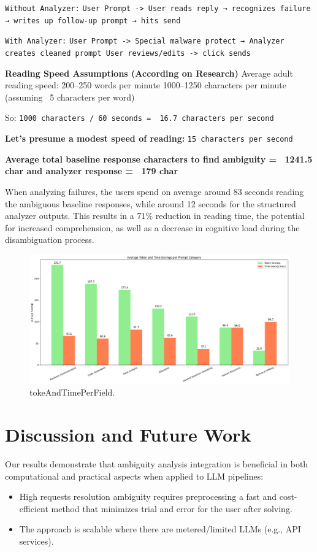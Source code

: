 \documentclass[conference]{IEEEtran}
\begin{document}
\texttt{Without Analyzer:}
\texttt{User Prompt -> User reads reply → recognizes failure → writes up follow-up prompt → hits send}

\texttt{With Analyzer:}
\texttt{User Prompt -> Special malware protect → Analyzer creates cleaned prompt User reviews/edits -> click sends}

\textbf{Reading Speed Assumptions (According on Research)}
Average adult reading speed:
200–250 words per minute
1000–1250 characters per minute (assuming ~5 characters per word)

So:
\texttt{1000 characters / 60 seconds = ~16.7 characters per second}

\textbf{Let's presume a modest speed of reading:}
\texttt{15 characters per second}

\textbf{Average total baseline response characters to find ambiguity = ~1241.5 char and analyzer response = ~179 char}

When analyzing failures, the users spend on average around 83 seconds reading the ambiguous baseline responses, while around 12 seconds for the structured analyzer outputs. This results in a 71\% reduction in reading time, the potential for increased comprehension, as well as a decrease in cognitive load during the disambiguation process.

\begin{figure}[!t]
\centering
\includegraphics[width=\columnwidth]{images/Figure5.jpeg}
\caption{tokeAndTimePerField.}
\label{fig_timeperfield}
\end{figure}

\section{Discussion and Future Work}
Our results demonstrate that ambiguity analysis integration is beneficial in both computational and practical aspects when applied to LLM pipelines:
\begin{itemize}
    \item High requests resolution ambiguity requires preprocessing a fast and cost-efficient method that minimizes trial and error for the user after solving.
    \item The approach is scalable where there are metered/limited LLMs (e.g., API services).
\end{itemize}
\end{document}

